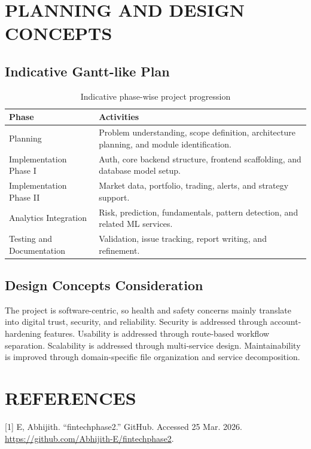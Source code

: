\documentclass[12pt,a4paper]{report}
\begin{document}
\chapter{PLANNING AND DESIGN CONCEPTS}
\section{Indicative Gantt-like Plan}
\begin{table}[H]
\centering
\caption{Indicative phase-wise project progression}
\begin{tabularx}{\textwidth}{>{\raggedright\arraybackslash}p{1.8in} X}
\toprule
\textbf{Phase} & \textbf{Activities} \\
\midrule
Planning & Problem understanding, scope definition, architecture planning, and module identification. \\
Implementation Phase I & Auth, core backend structure, frontend scaffolding, and database model setup. \\
Implementation Phase II & Market data, portfolio, trading, alerts, and strategy support. \\
Analytics Integration & Risk, prediction, fundamentals, pattern detection, and related ML services. \\
Testing and Documentation & Validation, issue tracking, report writing, and refinement. \\
\bottomrule
\end{tabularx}
\end{table}

\section{Design Concepts Consideration}
The project is software-centric, so health and safety concerns mainly translate into digital trust, security, and reliability. Security is addressed through account-hardening features. Usability is addressed through route-based workflow separation. Scalability is addressed through multi-service design. Maintainability is improved through domain-specific file organization and service decomposition.

\chapter*{REFERENCES}
[1] E, Abhijith. ``fintechphase2.'' GitHub. Accessed 25 Mar. 2026. \url{https://github.com/Abhijith-E/fintechphase2}.
\end{document}
